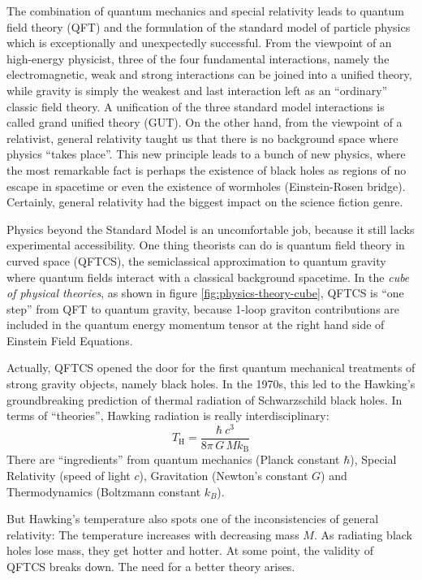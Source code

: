 \documentclass[12pt,a4paper]{report}
\numberwithin{equation}{chapter}
\begin{document}
The combination of quantum mechanics and special relativity leads to quantum field theory (QFT) and the formulation of the standard model of particle physics which is exceptionally and unexpectedly successful. From the viewpoint of an high-energy physicist, three of the four fundamental interactions, namely the electromagnetic, weak and strong interactions can be joined into a unified theory, while gravity is simply the weakest and last interaction left as an ``ordinary'' classic field theory. A unification of the three standard model interactions is called grand unified theory (GUT). On the other hand, from the viewpoint of a relativist, general relativity taught us that there is no background space where physics ``takes place''. This new principle leads to a bunch of new physics, where the most remarkable fact is perhaps the existence of black holes as regions of no escape in spacetime or even the existence of wormholes (Einstein-Rosen bridge). Certainly, general relativity had the biggest impact on the science fiction genre.

Physics beyond the Standard Model is an uncomfortable job,
because it still lacks experimental accessibility.
One thing theorists can do is quantum field theory in curved space (QFTCS), the
semiclassical approximation to quantum gravity where quantum fields interact with a
classical background spacetime. In the \emph{cube of physical theories}, as shown
in figure \ref{fig:physics-theory-cube}, QFTCS is ``one step'' from QFT to quantum gravity, because
1-loop graviton contributions are included in the quantum energy momentum tensor at the right hand side of Einstein Field Equations.


Actually, QFTCS opened the door for the first quantum mechanical treatments of strong gravity objects, namely black holes. In the 1970s, this led to the Hawking's groundbreaking prediction of thermal radiation of Schwarzschild black holes. In terms of ``theories'', Hawking radiation is really interdisciplinary:
%
\begin{equation*}
T_\mathrm{H} = \frac{\hbar\ c^3}{8\pi\,G\,M k_\mathrm{B}}
\end{equation*}
%
There are ``ingredients'' from quantum mechanics (Planck constant $\hbar$), Special Relativity (speed of light $c$), Gravitation (Newton's constant $G$) and Thermodynamics (Boltzmann constant $k_B$).

But Hawking's temperature also spots one of the inconsistencies of general relativity: The temperature increases with decreasing mass $M$. As radiating black holes lose mass, they get hotter and hotter. At some point, the validity of QFTCS breaks down. The need for a better theory arises.
\end{document}
